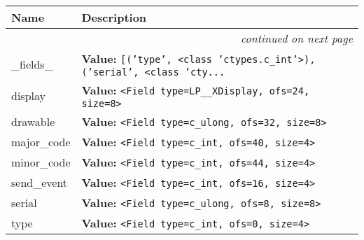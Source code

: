     \vspace{-1cm}
\hspace{\varindent}\begin{longtable}{|p{\varnamewidth}|p{\vardescrwidth}|l}
\cline{1-2}
\cline{1-2} \centering \textbf{Name} & \centering \textbf{Description}& \\
\cline{1-2}
\endhead\cline{1-2}\multicolumn{3}{r}{\small\textit{continued on next page}}\\\endfoot\cline{1-2}
\endlastfoot\raggedright \_\-f\-i\-e\-l\-d\-s\-\_\- & \raggedright \textbf{Value:} 
{\tt \texttt{[}\texttt{(}\texttt{'}\texttt{type}\texttt{'}\texttt{, }{\textless}class 'ctypes.c\_int'{\textgreater}\texttt{)}\texttt{, }\texttt{(}\texttt{'}\texttt{serial}\texttt{'}\texttt{, }{\textless}class 'cty\texttt{...}}&\\
\cline{1-2}
\raggedright d\-i\-s\-p\-l\-a\-y\- & \raggedright \textbf{Value:} 
{\tt {\textless}Field type=LP\_\_XDisplay, ofs=24, size=8{\textgreater}}&\\
\cline{1-2}
\raggedright d\-r\-a\-w\-a\-b\-l\-e\- & \raggedright \textbf{Value:} 
{\tt {\textless}Field type=c\_ulong, ofs=32, size=8{\textgreater}}&\\
\cline{1-2}
\raggedright m\-a\-j\-o\-r\-\_\-c\-o\-d\-e\- & \raggedright \textbf{Value:} 
{\tt {\textless}Field type=c\_int, ofs=40, size=4{\textgreater}}&\\
\cline{1-2}
\raggedright m\-i\-n\-o\-r\-\_\-c\-o\-d\-e\- & \raggedright \textbf{Value:} 
{\tt {\textless}Field type=c\_int, ofs=44, size=4{\textgreater}}&\\
\cline{1-2}
\raggedright s\-e\-n\-d\-\_\-e\-v\-e\-n\-t\- & \raggedright \textbf{Value:} 
{\tt {\textless}Field type=c\_int, ofs=16, size=4{\textgreater}}&\\
\cline{1-2}
\raggedright s\-e\-r\-i\-a\-l\- & \raggedright \textbf{Value:} 
{\tt {\textless}Field type=c\_ulong, ofs=8, size=8{\textgreater}}&\\
\cline{1-2}
\raggedright t\-y\-p\-e\- & \raggedright \textbf{Value:} 
{\tt {\textless}Field type=c\_int, ofs=0, size=4{\textgreater}}&\\
\cline{1-2}
\end{longtable}



